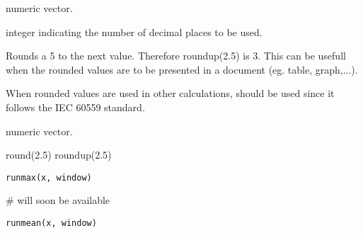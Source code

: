 \documentclass[a4paper]{book}
\begin{document}
%
\begin{Arguments}
\begin{ldescription}
\item[\code{x}] numeric vector.
\item[\code{digits}] integer indicating the number of decimal places to be used.
\end{ldescription}
\end{Arguments}
%
\begin{Details}\relax

Rounds a 5 to the next value. Therefore roundup(2.5) is 3.
This can be usefull when the rounded values are to be presented in a document (eg. table, graph,...).

When rounded values are used in other calculations,  should be
used since it follows the IEC 60559 standard.
\end{Details}
%
\begin{Value}
numeric vector.
\end{Value}
%
\begin{SeeAlso}\relax
{}
\end{SeeAlso}
%
\begin{Examples}
\begin{ExampleCode}
round(2.5)
roundup(2.5)
\end{ExampleCode}
\end{Examples}
\newpage
{}
%
\begin{Usage}
\begin{verbatim}
runmax(x, window)
\end{verbatim}
\end{Usage}
%
\begin{Arguments}
\begin{ldescription}
\item[\code{x}] 


\item[\code{window}] 


\end{ldescription}
\end{Arguments}
%
\begin{Examples}
\begin{ExampleCode}
# will soon be available
\end{ExampleCode}
\end{Examples}
\newpage
{}
%
\begin{Usage}
\begin{verbatim}
runmean(x, window)
\end{verbatim}
\end{Usage}
\end{document}
